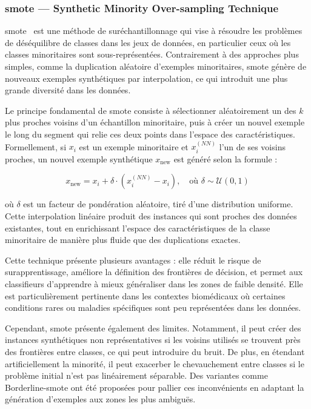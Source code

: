 \documentclass[12pt]{report}
\begin{document}
\subsubsection{\gls{smote} — \textbf{Synthetic Minority Over-sampling Technique}}

\gls{smote}~\cite{chawla2002smote} est une méthode de suréchantillonnage qui vise à résoudre les problèmes de déséquilibre de classes dans les jeux de données, en particulier ceux où les classes minoritaires sont sous-représentées. Contrairement à des approches plus simples, comme la duplication aléatoire d’exemples minoritaires, \gls{smote} génère de nouveaux exemples synthétiques par interpolation, ce qui introduit une plus grande diversité dans les données.

Le principe fondamental de \gls{smote} consiste à sélectionner aléatoirement un des $k$ plus proches voisins d’un échantillon minoritaire, puis à créer un nouvel exemple le long du segment qui relie ces deux points dans l’espace des caractéristiques. Formellement, si $x_i$ est un exemple minoritaire et $x_i^{(NN)}$ l’un de ses voisins proches, un nouvel exemple synthétique $x_{\text{new}}$ est généré selon la formule :

\begin{equation}
x_{\text{new}} = x_i + \delta \cdot (x_i^{(NN)} - x_i), \quad \text{où } \delta \sim \mathcal{U}(0,1)
\end{equation}

où $\delta$ est un facteur de pondération aléatoire, tiré d’une distribution uniforme. Cette interpolation linéaire produit des instances qui sont proches des données existantes, tout en enrichissant l’espace des caractéristiques de la classe minoritaire de manière plus fluide que des duplications exactes.

Cette technique présente plusieurs avantages : elle réduit le risque de surapprentissage, améliore la définition des frontières de décision, et permet aux classifieurs d'apprendre à mieux généraliser dans les zones de faible densité. Elle est particulièrement pertinente dans les contextes biomédicaux où certaines conditions rares ou maladies spécifiques sont peu représentées dans les données.

Cependant, \gls{smote} présente également des limites. Notamment, il peut créer des instances synthétiques non représentatives si les voisins utilisés se trouvent près des frontières entre classes, ce qui peut introduire du bruit. De plus, en étendant artificiellement la minorité, il peut exacerber le chevauchement entre classes si le problème initial n'est pas linéairement séparable. Des variantes comme Borderline-\gls{smote} ont été proposées pour pallier ces inconvénients en adaptant la génération d’exemples aux zones les plus ambiguës.
\end{document}

